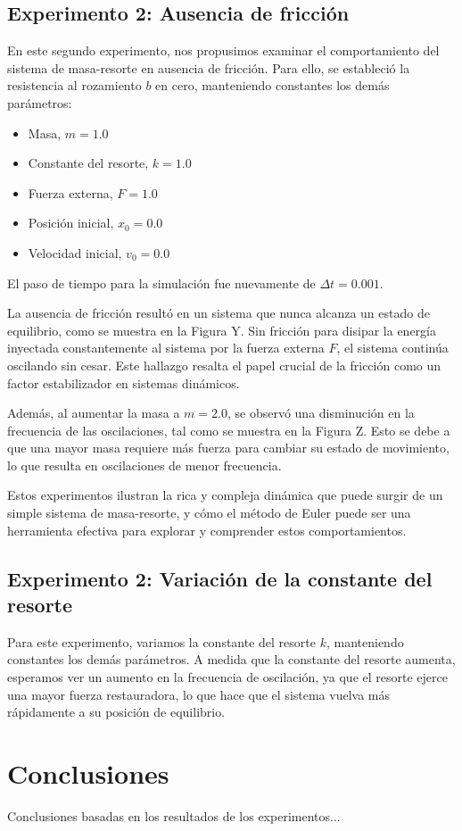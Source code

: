 \documentclass{article}
\begin{document}
\subsection{Experimento 2: Ausencia de fricción}
En este segundo experimento, nos propusimos examinar el comportamiento del sistema de masa-resorte en ausencia de fricción. Para ello, se estableció la resistencia al rozamiento $b$ en cero, manteniendo constantes los demás parámetros:

\begin{itemize}
\item Masa, $m = 1.0$
\item Constante del resorte, $k = 1.0$
\item Fuerza externa, $F = 1.0$
\item Posición inicial, $x_0 = 0.0$
\item Velocidad inicial, $v_0 = 0.0$
\end{itemize}

El paso de tiempo para la simulación fue nuevamente de $\Delta t= 0.001$.

La ausencia de fricción resultó en un sistema que nunca alcanza un estado de equilibrio, como se muestra en la Figura Y. Sin fricción para disipar la energía inyectada constantemente al sistema por la fuerza externa $F$, el sistema continúa oscilando sin cesar. Este hallazgo resalta el papel crucial de la fricción como un factor estabilizador en sistemas dinámicos.

Además, al aumentar la masa a $m = 2.0$, se observó una disminución en la frecuencia de las oscilaciones, tal como se muestra en la Figura Z. Esto se debe a que una mayor masa requiere más fuerza para cambiar su estado de movimiento, lo que resulta en oscilaciones de menor frecuencia.

Estos experimentos ilustran la rica y compleja dinámica que puede surgir de un simple sistema de masa-resorte, y cómo el método de Euler puede ser una herramienta efectiva para explorar y comprender estos comportamientos.    


\subsection{Experimento 2: Variación de la constante del resorte}
Para este experimento, variamos la constante del resorte $k$, manteniendo constantes los demás parámetros. A medida que la constante del resorte aumenta, esperamos ver un aumento en la frecuencia de oscilación, ya que el resorte ejerce una mayor fuerza restauradora, lo que hace que el sistema vuelva más rápidamente a su posición de equilibrio.



\section{Conclusiones}
Conclusiones basadas en los resultados de los experimentos...
\end{document}

